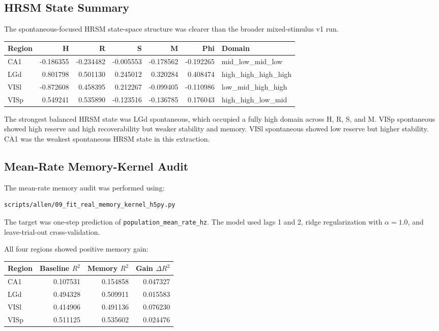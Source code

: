 \subsection{HRSM State Summary}

The spontaneous-focused HRSM state-space structure was clearer than the broader mixed-stimulus v1 run.

\begin{center}
\begin{tabular}{lrrrrrl}
\hline
Region & H & R & S & M & Phi & Domain \\
\hline
CA1 & -0.186355 & -0.234482 & -0.005553 & -0.178562 & -0.192265 & mid\_low\_mid\_low \\
LGd & 0.801798 & 0.501130 & 0.245012 & 0.320284 & 0.408474 & high\_high\_high\_high \\
VISl & -0.872608 & 0.458395 & 0.212267 & -0.099405 & -0.110986 & low\_mid\_high\_high \\
VISp & 0.549241 & 0.535890 & -0.123516 & -0.136785 & 0.176043 & high\_high\_low\_mid \\
\hline
\end{tabular}
\end{center}

The strongest balanced HRSM state was LGd spontaneous, which occupied a fully high domain across H, R, S, and M. VISp spontaneous showed high reserve and high recoverability but weaker stability and memory. VISl spontaneous showed low reserve but higher stability. CA1 was the weakest spontaneous HRSM state in this extraction.

\subsection{Mean-Rate Memory-Kernel Audit}

The mean-rate memory audit was performed using:

\begin{verbatim}
scripts/allen/09_fit_real_memory_kernel_h5py.py
\end{verbatim}

The target was one-step prediction of \texttt{population\_mean\_rate\_hz}. The model used lags 1 and 2, ridge regularization with \(\alpha = 1.0\), and leave-trial-out cross-validation.

All four regions showed positive memory gain:

\begin{center}
\begin{tabular}{lrrr}
\hline
Region & Baseline \(R^2\) & Memory \(R^2\) & Gain \(\Delta R^2\) \\
\hline
CA1 & 0.107531 & 0.154858 & 0.047327 \\
LGd & 0.494328 & 0.509911 & 0.015583 \\
VISl & 0.414906 & 0.491136 & 0.076230 \\
VISp & 0.511125 & 0.535602 & 0.024476 \\
\hline
\end{tabular}
\end{center}

